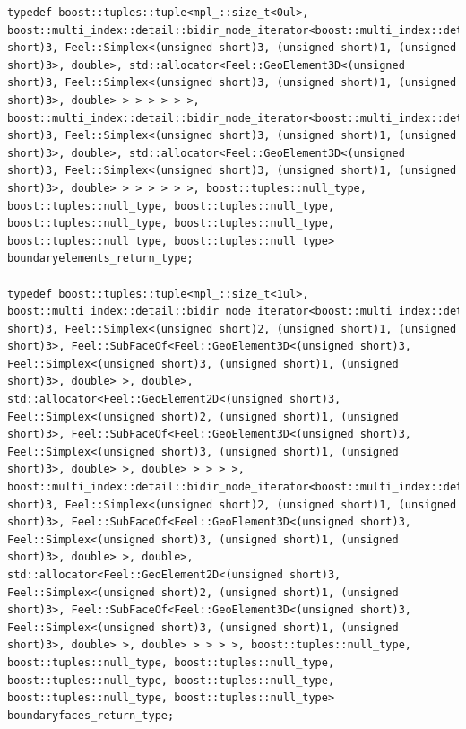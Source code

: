 \documentclass[french,12pt]{article}
\begin{document}
\begin{lstlisting}
typedef boost::tuples::tuple<mpl_::size_t<0ul>, boost::multi_index::detail::bidir_node_iterator<boost::multi_index::detail::ordered_index_node<boost::multi_index::detail::ordered_index_node<boost::multi_index::detail::ordered_index_node<boost::multi_index::detail::index_node_base<Feel::GeoElement3D<(unsigned short)3, Feel::Simplex<(unsigned short)3, (unsigned short)1, (unsigned short)3>, double>, std::allocator<Feel::GeoElement3D<(unsigned short)3, Feel::Simplex<(unsigned short)3, (unsigned short)1, (unsigned short)3>, double> > > > > > >, boost::multi_index::detail::bidir_node_iterator<boost::multi_index::detail::ordered_index_node<boost::multi_index::detail::ordered_index_node<boost::multi_index::detail::ordered_index_node<boost::multi_index::detail::index_node_base<Feel::GeoElement3D<(unsigned short)3, Feel::Simplex<(unsigned short)3, (unsigned short)1, (unsigned short)3>, double>, std::allocator<Feel::GeoElement3D<(unsigned short)3, Feel::Simplex<(unsigned short)3, (unsigned short)1, (unsigned short)3>, double> > > > > > >, boost::tuples::null_type, boost::tuples::null_type, boost::tuples::null_type, boost::tuples::null_type, boost::tuples::null_type, boost::tuples::null_type, boost::tuples::null_type> boundaryelements_return_type;

typedef boost::tuples::tuple<mpl_::size_t<1ul>, boost::multi_index::detail::bidir_node_iterator<boost::multi_index::detail::ordered_index_node<boost::multi_index::detail::index_node_base<Feel::GeoElement2D<(unsigned short)3, Feel::Simplex<(unsigned short)2, (unsigned short)1, (unsigned short)3>, Feel::SubFaceOf<Feel::GeoElement3D<(unsigned short)3, Feel::Simplex<(unsigned short)3, (unsigned short)1, (unsigned short)3>, double> >, double>, std::allocator<Feel::GeoElement2D<(unsigned short)3, Feel::Simplex<(unsigned short)2, (unsigned short)1, (unsigned short)3>, Feel::SubFaceOf<Feel::GeoElement3D<(unsigned short)3, Feel::Simplex<(unsigned short)3, (unsigned short)1, (unsigned short)3>, double> >, double> > > > >, boost::multi_index::detail::bidir_node_iterator<boost::multi_index::detail::ordered_index_node<boost::multi_index::detail::index_node_base<Feel::GeoElement2D<(unsigned short)3, Feel::Simplex<(unsigned short)2, (unsigned short)1, (unsigned short)3>, Feel::SubFaceOf<Feel::GeoElement3D<(unsigned short)3, Feel::Simplex<(unsigned short)3, (unsigned short)1, (unsigned short)3>, double> >, double>, std::allocator<Feel::GeoElement2D<(unsigned short)3, Feel::Simplex<(unsigned short)2, (unsigned short)1, (unsigned short)3>, Feel::SubFaceOf<Feel::GeoElement3D<(unsigned short)3, Feel::Simplex<(unsigned short)3, (unsigned short)1, (unsigned short)3>, double> >, double> > > > >, boost::tuples::null_type, boost::tuples::null_type, boost::tuples::null_type, boost::tuples::null_type, boost::tuples::null_type, boost::tuples::null_type, boost::tuples::null_type> boundaryfaces_return_type;


\end{lstlisting}
\end{document}
